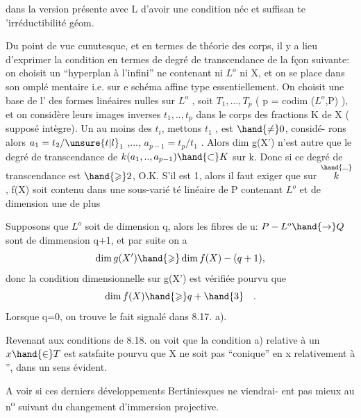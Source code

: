 
dans la version présente  avec L d'avoir une condition néc et suffisan%
te 'irréductibilité géom. 

Du point de vue cunutesque,  et en termes de théorie des
corps, il y a lieu d'exprimer la condition  en termes de
degré de transcendance de la fçon suivante: on choisit un ``hyperplan
à l'infini'' ne contenant ni $L^{o}$ ni X, et on se place dans son omplé%
mentaire i.e. sur e schéma affine  type essentiellement. On choisit
une base de l' des formes linéaires nulles sur $L^{o}$ , 
 soit $T_{1},\ldots,T_{p}$ ( p = codim ($L^{o}$,P) ), et on considère
leurs images inverses $t_{1},..,t_{p}$ dans le corps des fractions K de X
( supposé intègre). Un au moins des $t_{i}$, mettons $t_{1}$ , est $\hand{\neq} 0$, considé-%
rons alors $a_{1} = t_{2}/\unsure{t|l}_{1}$ ,..., $a_{p-1} = t_{p}/t_{1}$ . Alors dim g(X') n'est
autre que le degré de transcendance de $k(a_{1},..,a_{p-1}) \hand{\subset} K$ sur k. Donc
si ce degré de transcendance est $\hand{\geqslant} 2$, O.K.  S'il est 1,
alors il faut exiger que sur $\overset{\hand{\rule{0.6em}{0.35pt}}}{k}$ , f(X) soit contenu dans une sous-varié%
té linéaire de P contenant $L^{o}$ et de dimension une de plus

Supposons que $L^{o}$ soit de dimension q, alors les fibres de u:
$P - L^{o} \hand{\to} Q$ sont de dimmension q+1,  et par suite on a
\[ \dim g(X') \hand{\geqslant} \dim f(X) - (q+1) , \]
donc la condition dimensionnelle sur g(X') est vérifiée pourvu que
\[ \dim f(X) \hand{\geqslant} q+\hand{3} \quad . \]
Lorsque q=0, on trouve le fait signalé dans 8.17. a).  

Revenant aux conditions de 8.18. on voit que la condition a)
relative à un $x \hand{\in} T$ est satsfaite pourvu que X ne soit pas ``conique''
en x relativement à '', dans un sens évident.

A voir si ces derniers développements Bertiniesques ne viendrai-%
ent pas mieux au n\textsuperscript{o} suivant du changement d'immersion projective. 

